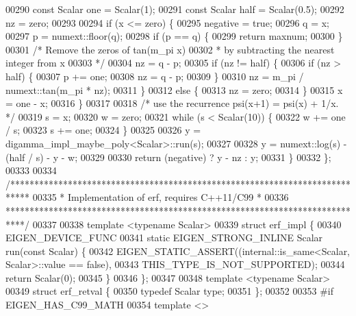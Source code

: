 \begin{DoxyCode}
00290     \textcolor{keyword}{const} Scalar one = Scalar(1);
00291     \textcolor{keyword}{const} Scalar half = Scalar(0.5);
00292     nz = zero;
00293 
00294     \textcolor{keywordflow}{if} (x <= zero) \{
00295       negative = \textcolor{keyword}{true};
00296       q = x;
00297       p = numext::floor(q);
00298       \textcolor{keywordflow}{if} (p == q) \{
00299         \textcolor{keywordflow}{return} maxnum;
00300       \}
00301       \textcolor{comment}{/* Remove the zeros of tan(m\_pi x)}
00302 \textcolor{comment}{       * by subtracting the nearest integer from x}
00303 \textcolor{comment}{       */}
00304       nz = q - p;
00305       \textcolor{keywordflow}{if} (nz != half) \{
00306         \textcolor{keywordflow}{if} (nz > half) \{
00307           p += one;
00308           nz = q - p;
00309         \}
00310         nz = m\_pi / numext::tan(m\_pi * nz);
00311       \}
00312       \textcolor{keywordflow}{else} \{
00313         nz = zero;
00314       \}
00315       x = one - x;
00316     \}
00317 
00318     \textcolor{comment}{/* use the recurrence psi(x+1) = psi(x) + 1/x. */}
00319     s = x;
00320     w = zero;
00321     \textcolor{keywordflow}{while} (s < Scalar(10)) \{
00322       w += one / s;
00323       s += one;
00324     \}
00325 
00326     y = digamma\_impl\_maybe\_poly<Scalar>::run(s);
00327 
00328     y = numext::log(s) - (half / s) - y - w;
00329 
00330     \textcolor{keywordflow}{return} (negative) ? y - nz : y;
00331   \}
00332 \};
00333 
00334 \textcolor{comment}{/****************************************************************************}
00335 \textcolor{comment}{ * Implementation of erf, requires C++11/C99                                *}
00336 \textcolor{comment}{ ****************************************************************************/}
00337 
00338 \textcolor{keyword}{template} <\textcolor{keyword}{typename} Scalar>
00339 \textcolor{keyword}{struct }erf\_impl \{
00340   EIGEN\_DEVICE\_FUNC
00341   \textcolor{keyword}{static} EIGEN\_STRONG\_INLINE Scalar run(\textcolor{keyword}{const} Scalar) \{
00342     EIGEN\_STATIC\_ASSERT((internal::is\_same<Scalar, Scalar>::value == \textcolor{keyword}{false}),
00343                         THIS\_TYPE\_IS\_NOT\_SUPPORTED);
00344     \textcolor{keywordflow}{return} Scalar(0);
00345   \}
00346 \};
00347 
00348 \textcolor{keyword}{template} <\textcolor{keyword}{typename} Scalar>
00349 \textcolor{keyword}{struct }erf\_retval \{
00350   \textcolor{keyword}{typedef} Scalar type;
00351 \};
00352 
00353 \textcolor{preprocessor}{#if EIGEN\_HAS\_C99\_MATH}
00354 \textcolor{keyword}{template} <>

\end{DoxyCode}
